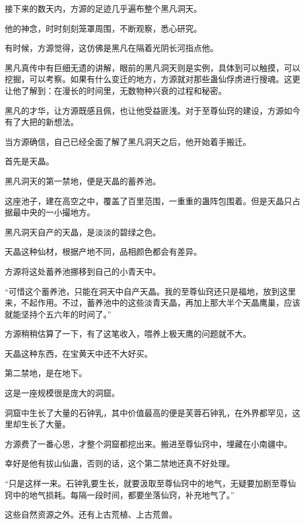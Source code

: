 
\begin{this_body}

接下来的数天内，方源的足迹几乎遍布整个黑凡洞天。

他的神念，时时刻刻笼罩周围，不断观察，悉心研究。

有时候，方源觉得，这仿佛是黑凡在隔着光阴长河指点他。

黑凡真传中有巨细无遗的讲解，眼前的黑凡洞天则是实例，具体到可以触摸，可以挖掘，可以考察。如果有什么变迁的地方，方源就对那些蛊仙俘虏进行搜魂。这更让他了解到：在漫长的时间里，无数物种兴衰的过程和秘密。

黑凡的才华，让方源既感且佩，也让他受益匪浅。对于至尊仙窍的建设，方源如今有了大把的新想法。

当方源确信，自己已经全面了解了黑凡洞天之后，他开始着手搬迁。

首先是天晶。

黑凡洞天的第一禁地，便是天晶的蓄养池。

这座池子，建在高空之中，覆盖了百里范围，一重重的蛊阵包围着。但是天晶只占据最中央的一小撮地方。

黑凡洞天自产的天晶，是淡淡的碧绿之色。

天晶这种仙材，根据产地不同，品相颜色都会有差异。

方源将这处蓄养池挪移到自己的小青天中。

“可惜这个蓄养池，只能在洞天中自产天晶。我的至尊仙窍还只是福地，放到这里来，不起作用。不过，蓄养池中的这些淡青天晶，再加上那大半个天晶鹰巢，应该就能坚持个五六年的时间了。”

方源稍稍估算了一下，有了这笔收入，喂养上极天鹰的问题就不大。

天晶这种东西，在宝黄天中还不大好买。

第二禁地，是在地下。

这是一座规模很是庞大的洞窟。

洞窟中生长了大量的石钟乳，其中价值最高的便是芙蓉石钟乳，在外界都罕见，这里却生长了大量。

方源费了一番心思，才整个洞窟都挖出来。搬进至尊仙窍中，埋藏在小南疆中。

幸好是他有拔山仙蛊，否则的话，这个第二禁地还真不好处理。

“只是这样一来。石钟乳要生长，就要汲取至尊仙窍中的地气，无疑要加剧至尊仙窍中的地气损耗。每隔一段时间，都要坐落仙窍，补充地气了。”

这些自然资源之外。还有上古荒植、上古荒兽。


\end{this_body}
